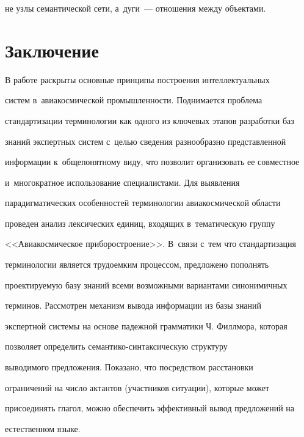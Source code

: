 не узлы семантической сети, а~дуги~--- отношения между объектами.



\vspace*{-6pt}

     

     \section{Заключение}

     

     \vspace*{-2pt}

  

  В работе раскрыты основные принципы построения интеллектуальных 

сис\-тем в~авиакосмической промышленности. Поднимается проблема 

стандартизации терминологии как одного из ключевых этапов разработки баз 

знаний экспертных систем с~целью сведения разнообразно представленной 

информации к~общепонятному виду, что позволит организовать ее совместное 

и~многократное использование специалистами. Для выявления 

парадигматических особенностей терминологии авиакосмической области 

проведен анализ лексических единиц, входящих в~тематическую группу 

<<Авиакосмическое приборостроение>>. В~связи с~тем что стандартизация 

терминологии является трудоемким процессом, предложено пополнять 

проектируемую базу знаний всеми возможными вариантами синонимичных 

терминов. Рассмотрен механизм вывода информации из базы знаний 

экспертной системы на основе падежной грамматики Ч. Филлмора, которая 

позволяет определить се\-ман\-ти\-ко-син\-так\-си\-че\-скую структуру 

выводимого предложения. Показано, что посредством расстановки 

ограничений на число актантов (участников ситуации), которые может 

присоединять глагол, можно обеспечить эффективный вывод предложений на 

естественном языке. 



